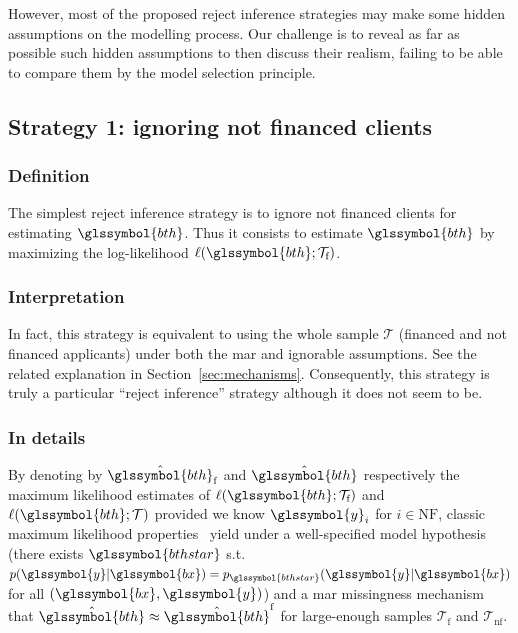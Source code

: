However, most of the proposed reject inference strategies may make some hidden assumptions on the modelling process. Our challenge is to reveal as far as possible such hidden assumptions to then discuss their realism,  
failing to be able to compare them by the model selection principle.

\subsection{Strategy 1: ignoring not financed clients} \label{subsec:no_reject} \label{subsec:strat1}

\subsubsection{Definition}
The simplest reject inference strategy is to ignore not financed clients for estimating $\glssymbol{bth}$. Thus it consists to estimate $\glssymbol{bth}$ by maximizing the log-likelihood $\ell(\glssymbol{bth};\mathcal{T}_{\text{f}})$.

\subsubsection{Interpretation}
In fact, this strategy is equivalent to using the whole sample $\mathcal{T}$ (financed and not financed applicants) under both the \gls{mar} and ignorable assumptions. See the related explanation in Section~\ref{sec:mechanisms}. Consequently, this strategy is truly a particular ``reject inference'' strategy although it does not seem to be.

\subsubsection{In details}
By denoting by $\hat{\glssymbol{bth}}_\text{f}$ and $\hat{\glssymbol{bth}}$ respectively the maximum likelihood estimates of $\ell(\glssymbol{bth};\mathcal{T}_{\text{f}})$ and $\ell(\glssymbol{bth};\mathcal{T})$ provided we know $\glssymbol{y}_i$ for $i \in \text{NF}$, classic maximum likelihood properties~\cite{10.2307/1912526,zadrozny2004learning} yield under a well-specified model hypothesis (there exists $\glssymbol{bthstar}$ s.t.\ $p(\glssymbol{y} | \glssymbol{bx}) = p_{\glssymbol{bthstar}}(\glssymbol{y} | \glssymbol{bx})$ for all $(\glssymbol{bx},\glssymbol{y})$) and a \gls{mar} missingness mechanism that $\hat{\glssymbol{bth}} \approx \hat{\glssymbol{bth}}^\text{f}$ for large-enough samples $\mathcal{T}_{\text{f}}$ and $\mathcal{T}_{\text{nf}}$.



